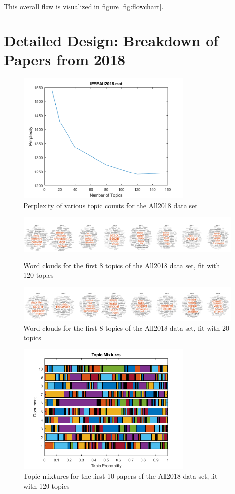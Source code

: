 \documentclass[conference]{IEEEtran}
\begin{document}
This overall flow is visualized in figure \ref{fig:flowchart}.

\section{Detailed Design: Breakdown of Papers from 2018}

\begin{figure}
	\centering
	\includegraphics[width=3.4in]{all2018_ppl_120.png}
	\caption{Perplexity of various topic counts for the All2018 data set}
	\label{fig:all2018_ppl_120}
\end{figure}

\begin{figure}[tb]
	\centering
	\includegraphics[width=7.0in]{all2018_cloud_120.png}
	\caption{Word clouds for the first 8 topics of the All2018 data set, fit with 120 topics}
	\label{fig:all2018_cloud_120}
	\includegraphics[width=7.0in]{all2018_cloud_20.png}
	\caption{Word clouds for the first 8 topics of the All2018 data set, fit with 20 topics}
	\label{fig:all2018_cloud_20}
\end{figure}

\begin{figure}
	\centering
	\includegraphics[width=3.4in]{all2018_lda_120.png}
	\caption{Topic mixtures for the first 10 papers of the All2018 data set, fit with 120 topics}
	\label{fig:all2018_lda_120}
\end{figure}
\end{document}
